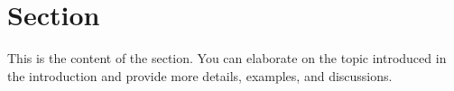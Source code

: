 \section{Section}

This is the content of the section. You can elaborate on the topic introduced in the introduction and provide more details, examples, and discussions.
